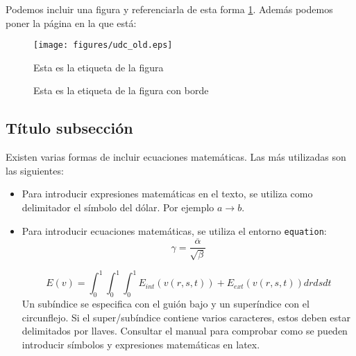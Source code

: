 Podemos incluir una figura y referenciarla de esta forma \ref{fig:logo}. Además podemos poner la página en la que está: \pageref{fig:logo}

\begin{figure}[htp]
    \begin{center}
        \texttt{[image: figures/udc\_old.eps]}
        \caption{Esta es la etiqueta de la figura}
        \label{fig:logo}
    \end{center}
\end{figure}


\begin{figure}[htp]
    \begin{center}
        \caption{Esta es la etiqueta de la figura con borde}
        \label{fig:logo2}
    \end{center}
\end{figure}


\subsection{Título subsección}

Existen varias formas de incluir ecuaciones matemáticas. Las más utilizadas son las siguientes:
\begin{itemize}
     \item Para introducir expresiones matemáticas en el texto, se utiliza como delimitador el símbolo del dólar. Por ejemplo $a \rightarrow b$.
     \item Para introducir ecuaciones matemáticas, se utiliza el entorno \texttt{equation}:
    \begin{equation}
        \gamma = \frac{\overline{\alpha}}{\sqrt{\beta}}
        \label{eq:equation_example_1}
    \end{equation}
    
    \begin{equation}
        E(v) =  \int^1_0 \int^1_0 \int^1_0 E_{int}(v(r,s,t)) + E_{ext}(v(r,s,t))drdsdt 
        \label{eq:equation_example_2}
    \end{equation}	
    Un subíndice se especifica con el guión bajo y un superíndice con el circunflejo. Si el super/subíndice contiene varios caracteres, estos deben estar delimitados por llaves. Consultar el manual para comprobar como se pueden introducir símbolos y expresiones matemáticas en latex.
\end{itemize}



